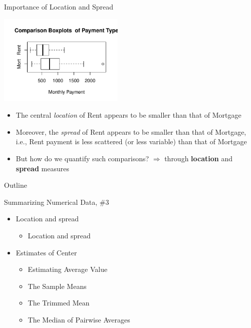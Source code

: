 \documentclass[14pt]{beamer}\usepackage[]{graphicx}\usepackage[]{color}
\begin{document}
\begin{frame}[fragile]{Importance of Location and Spread}


\includegraphics[width=6cm]{figure/LBL3a-1} 


\vspace{-3mm}

{\footnotesize{
\begin{itemize}
\item<1-> The central \textit{location} of Rent appears to be smaller than that of Mortgage
\item<2-> Moreover, the \textit{spread} of Rent appears to be smaller than that of  Mortgage, i.e., Rent payment is less scattered (or less variable)  than that of Mortgage
\item<3-> But how do we quantify such comparisons?  $\Rightarrow$ through \textbf{location} and \textbf{spread} measures
\end{itemize}
}}
\end{frame}

\begin{frame}[fragile]{Outline}

Summarizing Numerical Data, \#3

\begin{itemize}
\item Location and spread
  \begin{itemize}
  \item Location and spread
  \end{itemize}
\item Estimates of Center
  \begin{itemize}
  \item Estimating Average Value
  \item The Sample Means
  \item The Trimmed Mean
  \item The Median of Pairwise Averages
  \end{itemize}
\end{itemize}
\end{frame}
\end{document}
